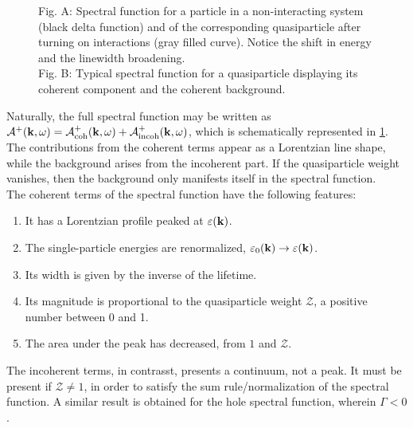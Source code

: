 \documentclass{homework}
\begin{document}
\begin{figure}
    \centering
    \qquad
    \caption{\small Fig. A: Spectral function for a particle in a non-interacting system (black delta function) and of the corresponding quasiparticle after turning on interactions (gray filled curve). Notice the shift in energy and the linewidth broadening. \\
    Fig. B: Typical spectral function for a quasiparticle displaying its coherent component and the coherent background. } 
    \label{figs:1p_Green_f_(in)coh}
\end{figure}

Naturally, the full spectral function may be written as $ \mathcal{A}^{+}({\bf k}, \omega) = \mathcal{A}^{+}_{\textnormal{coh}}({\bf k}, \omega) +  \mathcal{A}^{+}_{\textnormal{incoh}}({\bf k}, \omega) $, which is schematically represented in \cref{figs:1p_Green_f_(in)coh}. The contributions from the coherent terms appear as a Lorentzian line shape, while the background arises from the incoherent part. If the quasiparticle weight vanishes, then the background only manifests itself in the spectral function. \\

The coherent terms of the spectral function have the following features:

\begin{enumerate}
    \item It has a Lorentzian profile peaked at $\varepsilon({\bf k})$. 
    \item The single-particle energies are renormalized, $\varepsilon_0 ({\bf k}) \rightarrow \varepsilon ({\bf k})$. 
    \item Its width is given by the inverse of the lifetime. 
    \item Its magnitude is proportional to the quasiparticle weight $\mathcal{Z}$, a positive number between 0 and 1. 
    \item The area under the peak has decreased, from $1$ and $\mathcal{Z}$.
\end{enumerate}

The incoherent terms, in contrasst, presents a continuum, not a peak. It must be present if $\mathcal{Z} \neq 1$, in order to satisfy the sum rule/normalization of the spectral function. A similar result is obtained for the hole spectral function, wherein $\Gamma < 0$. \\
\end{document}
